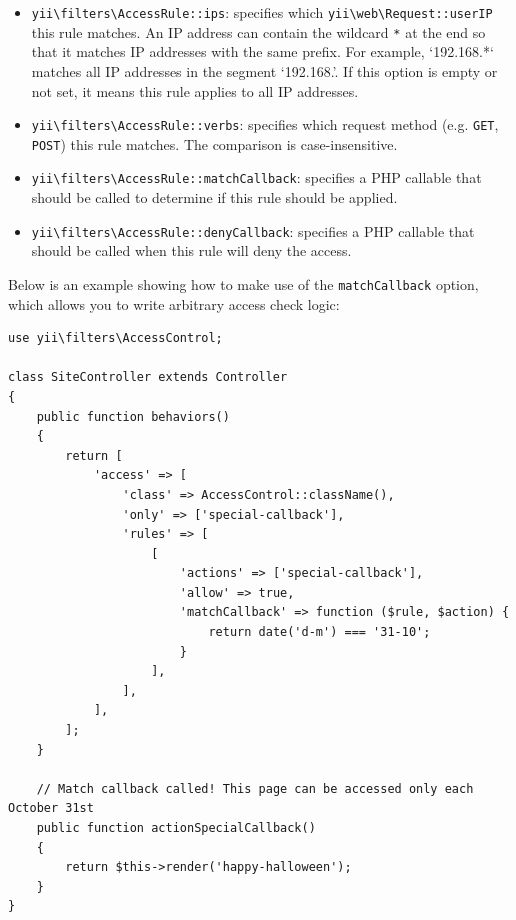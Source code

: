 \begin{itemize}
\item \texttt{yii{\allowbreak{}\textbackslash}filters{\allowbreak{}\textbackslash}AccessRule\allowbreak{}::\allowbreak{}ips}: specifies which \texttt{yii{\allowbreak{}\textbackslash}web{\allowbreak{}\textbackslash}Request\allowbreak{}::\allowbreak{}userIP} this rule matches.
An IP address can contain the wildcard \lstinline|*| at the end so that it matches IP addresses with the same prefix.
For example, `192.168.*` matches all IP addresses in the segment `192.168.'. If this option is empty or not set,
it means this rule applies to all IP addresses.


\item \texttt{yii{\allowbreak{}\textbackslash}filters{\allowbreak{}\textbackslash}AccessRule\allowbreak{}::\allowbreak{}verbs}: specifies which request method (e.g. \lstinline|GET|, \lstinline|POST|) this rule matches.
The comparison is case-insensitive.


\item \texttt{yii{\allowbreak{}\textbackslash}filters{\allowbreak{}\textbackslash}AccessRule\allowbreak{}::\allowbreak{}matchCallback}: specifies a PHP callable that should be called to determine
if this rule should be applied.


\item \texttt{yii{\allowbreak{}\textbackslash}filters{\allowbreak{}\textbackslash}AccessRule\allowbreak{}::\allowbreak{}denyCallback}: specifies a PHP callable that should be called when this rule
will deny the access.


\end{itemize}
Below is an example showing how to make use of the \lstinline|matchCallback| option, which allows you to write arbitrary access
check logic:

\lstset{language=php}\begin{lstlisting}
use yii\filters\AccessControl;

class SiteController extends Controller
{
    public function behaviors()
    {
        return [
            'access' => [
                'class' => AccessControl::className(),
                'only' => ['special-callback'],
                'rules' => [
                    [
                        'actions' => ['special-callback'],
                        'allow' => true,
                        'matchCallback' => function ($rule, $action) {
                            return date('d-m') === '31-10';
                        }
                    ],
                ],
            ],
        ];
    }

    // Match callback called! This page can be accessed only each October 31st
    public function actionSpecialCallback()
    {
        return $this->render('happy-halloween');
    }
}
\end{lstlisting}
